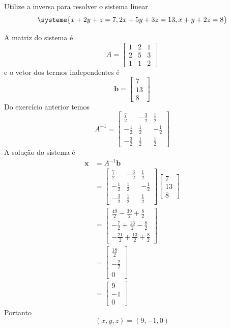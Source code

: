 \documentclass[a4paper,12pt,fleqn]{article}
\begin{document}
Utilize a inversa para resolver o sistema linear
\[
\systeme{
  x+2y+z=7,
  2x+5y+3z=13,
  x+y+2z=8
}
\]

\begin{answer}
A matriz do sistema é
\[
A=
\begin{bmatrix}
  1 & 2 & 1\\
  2 & 5 & 3\\
  1 & 1 & 2
\end{bmatrix}
\]
e o vetor dos termos independentes é
\[
\mathbf{b}=
\begin{bmatrix}
7\\13\\8
\end{bmatrix}
\]
Do exercício anterior temos
\[
A^{-1}=
\begin{bmatrix}
 \frac{7}{2} & -\frac{3}{2} &  \frac{1}{2}\\
-\frac{1}{2} &  \frac{1}{2} & -\frac{1}{2}\\
-\frac{3}{2} &  \frac{1}{2} &  \frac{1}{2}
\end{bmatrix}
\]
A solução do sistema é
\begin{align*}
\mathbf{x}
&=A^{-1}\mathbf{b}
\\[2mm]
&=
\begin{bmatrix}
 \frac{7}{2} & -\frac{3}{2} &  \frac{1}{2}\\
-\frac{1}{2} &  \frac{1}{2} & -\frac{1}{2}\\
-\frac{3}{2} &  \frac{1}{2} &  \frac{1}{2}
\end{bmatrix}
\begin{bmatrix}
7\\13\\8
\end{bmatrix}
\\[2mm]
&=
\begin{bmatrix}
\frac{49}{2}-\frac{39}{2}+\frac{8}{2}\\
-\frac{7}{2}+\frac{13}{2}-\frac{8}{2}\\
-\frac{21}{2}+\frac{13}{2}+\frac{8}{2}
\end{bmatrix}
\\[2mm]
&=
\begin{bmatrix}
\frac{18}{2}\\
-\frac{2}{2}\\
0
\end{bmatrix}
\\[2mm]
&=
\begin{bmatrix}
9\\-1\\0
\end{bmatrix}
\end{align*}
Portanto
\[
\boxed{
(x,y,z)=(9,-1,0)
}
\]
\end{answer}

\end{document}
